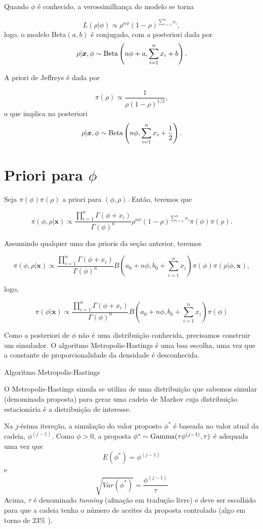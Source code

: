 \documentclass[
  letterpaper,
  DIV=11,
  numbers=noendperiod]{scrreprt}
\theoremstyle{definition}
\theoremstyle{definition}
\theoremstyle{plain}
\theoremstyle{remark}
\begin{document}
Quando \(\phi\) é conhecido, a verossimilhança do modelo se torna

\[L(\rho|\phi)\propto \rho^{n\phi}(1-\rho)^{\sum_{i=1}^n x_i},\] logo, o
modelo Beta\((a,b)\) é conjugado, com a posteriori dada por
\[\rho|\boldsymbol{x},\phi\sim\hbox{Beta}\left(n\phi+a,\sum_{i=1}^n x_i+b\right).\]

A priori de Jeffreys é dada por

\[\pi(\rho)\propto \frac{1}{\rho(1-\rho)^{1/2}},\] o que implica na
posteriori
\[\rho|\boldsymbol{x},\phi\sim\hbox{Beta}\left(n\phi,\sum_{i=1}^n x_i+\frac{1}{2}\right).\]

\section{\texorpdfstring{Priori para
\(\phi\)}{Priori para \textbackslash phi}}\label{priori-para-phi}

Seja \(\pi(\phi)\pi(\rho)\) a priori para \((\phi,\rho)\). Então,
teremos que

\[\pi(\phi,\rho|\boldsymbol{x})\propto \frac{\prod_{i=1}^n\Gamma(\phi+x_i)}{\Gamma(\phi)^n}\rho^{n\phi}(1-\rho)^{\sum_{i=1}^n x_i}\pi(\phi)\pi(\rho).\]

Assumindo qualquer uma das prioris da seção anterior, teremos

\[\pi(\phi,\rho|\boldsymbol{x})\propto \frac{\prod_{i=1}^n\Gamma(\phi+x_i)}{\Gamma(\phi)^n}B\left(a_0+n\phi,b_0+\sum_{i=1}^nx_i\right)\pi(\phi)\pi(\rho|\phi,\boldsymbol{x}),\]

logo,

\[\pi(\phi|\boldsymbol{x})\propto \frac{\prod_{i=1}^n\Gamma(\phi+x_i)}{\Gamma(\phi)^n}B\left(a_0+n\phi,b_0+\sum_{i=1}^nx_i\right)\pi(\phi)\]

Como a posteriori de \(\phi\) não é uma distribuição conhecida,
precisamos construir um simulador. O algoritmo Metropolis-Hastings é uma
boa escolha, uma vez que a constante de proporcionalidade da densidade é
desconhecida.

Algoritmo Metropolis-Hastings

O Metropolis-Hastings simula se utiliza de uma distribuição que sabemos
simular (denominada proposta) para gerar uma cadeia de Markov cuja
distribuição estacionária é a distribuição de interesse.

Na \(j\)-ésima itereção, a simulação do valor proposto \(\phi^*\) é
baseada no valor atual da cadeia, \(\phi^{(j-1)}\). Como \(\phi>0\), a
proposta \(\phi^*\sim \hbox{Gamma}(\tau\phi^{(j-1)},\tau)\) é adequada
uma vez que \[E(\phi^*)=\phi^{(j-1)}\] e
\[\sqrt{Var(\phi^*)}=\frac{\phi^{(j-1)}}{\tau}\] Acima, \(\tau\) é
denominado \emph{tunning} (afinação em tradução livre) e deve ser
escolhido para que a cadeia tenha o número de aceites da proposta
controlado (algo em torno de 23\% ).
\end{document}
